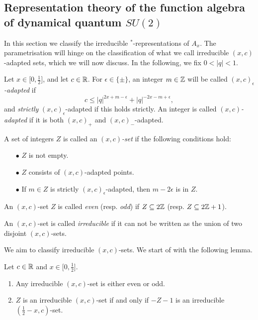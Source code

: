 \subsection{Representation theory of the function algebra of dynamical quantum $SU(2)$}


In this section we classify the irreducible $^*$-representations of $A_x$. The parametrisation will hinge on the classification of what we call irreducible $(x,c)$-adapted sets, which we will now discuss. In the following, we fix $0<|q|<1$.

\begin{Def}\label{DefAdapt} Let $x\in \lbrack 0,\frac{1}{2}\rbrack$, and let $c\in\mathbb{R}$. For $\epsilon \in \{\pm\}$, an integer $m\in \mathbb{Z}$ will be called \emph{$(x,c)_{\epsilon}$-adapted} if \begin{equation}\label{EqAd+}c \leq |q|^{2x+m-\epsilon}+|q|^{-2x-m+\epsilon},\end{equation} and \emph{strictly} $(x,c)_{\epsilon}$-adapted if this holds strictly. An integer is called \emph{$(x,c)$-adapted} if it is both $(x,c)_+$ and $(x,c)_-$-adapted. 

A set of integers $Z$ is called an  \emph{$(x,c)$-set} if the following conditions hold: \begin{itemize} 
\item[$\bullet$] $Z$ is not empty.
\item[$\bullet$] $Z$ consists of $(x,c)$-adapted points.
\item[$\bullet$] If $m\in Z$ is strictly $(x,c)_{\epsilon}$-adapted, then $m-2\epsilon$ is in $Z$.
\end{itemize}
An $(x,c)$-set $Z$ is called \emph{even} (resp. \emph{odd}) if $Z\subseteq 2\mathbb{Z}$ (resp. $Z\subseteq 2\mathbb{Z}+1$).

An $(x,c)$-set is called \emph{irreducible} if it can not be written as the union of two disjoint $(x,c)$-sets.
\end{Def}


We aim to classify irreducible $(x,c)$-sets. We start of with the following lemma.

\begin{Lem} Let $c\in\mathbb{R}$ and $x\in \lbrack 0,\frac{1}{2}\rbrack$.
\begin{enumerate} \item Any irreducible $(x,c)$-set is either even or odd.
\item $Z$ is an irreducible $(x,c)$-set if and only if $-Z-1$ is an irreducible $(\frac{1}{2}-x,c)$-set.
\end{enumerate}
\end{Lem}

